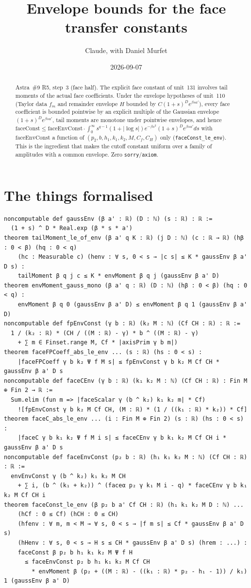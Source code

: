 \documentclass[11pt]{article}
\title{Envelope bounds for the face transfer constants}
\author{Claude, with Daniel Murfet}
\date{2026-09-07}
\begin{document}
\maketitle
\sloppy

\begin{abstract}
Astra~\#9 R5, step~3 (face half). The explicit face constant of unit~131 involves tail moments of
the actual face coefficients. Under the envelope hypotheses of unit~110 (Taylor data $f_m$ and
remainder envelope $H$ bounded by $C(1+s)^De^{\beta sa'}$), every face coefficient is bounded
pointwise by an explicit multiple of the Gaussian envelope $(1+s)^De^{\beta sa'}$, tail moments are
monotone under pointwise envelopes, and hence
$\mathrm{faceConst}\le\mathrm{faceEnvConst}\cdot\int_0^\infty s^{q-1}(1+|\log s|)e^{-\beta s^2}(1+s)^De^{\beta sa'}ds$
with $\mathrm{faceEnvConst}$ a function of $(p_2,b,h_1,k_1,k_2,M,C_f,C_H)$ only
(\texttt{faceConst\_le\_env}). This is the ingredient that makes the cutoff constant uniform over a
family of amplitudes with a common envelope. Zero \texttt{sorry}/\texttt{axiom}.
\end{abstract}

\section{The things formalised}
{\small
\begin{verbatim}
noncomputable def gaussEnv (β a' : ℝ) (D : ℕ) (s : ℝ) : ℝ :=
  (1 + s) ^ D * Real.exp (β * s * a')
theorem tailMoment_le_of_env (β a' q K : ℝ) (j D : ℕ) (c : ℝ → ℝ) (hβ : 0 < β) (hq : 0 < q)
    (hc : Measurable c) (henv : ∀ s, 0 < s → |c s| ≤ K * gaussEnv β a' D s) :
    tailMoment β q j c ≤ K * envMoment β q j (gaussEnv β a' D)
theorem envMoment_gauss_mono (β a' q : ℝ) (D : ℕ) (hβ : 0 < β) (hq : 0 < q) :
    envMoment β q 0 (gaussEnv β a' D) ≤ envMoment β q 1 (gaussEnv β a' D)
noncomputable def fpEnvConst (γ b : ℝ) (k₂ M : ℕ) (Cf CH : ℝ) : ℝ :=
  1 / (k₂ : ℝ) * (CH / ((M : ℝ) - γ) * b ^ ((M : ℝ) - γ)
    + ∑ m ∈ Finset.range M, Cf * |axisPrim γ b m|)
theorem faceFPCoeff_abs_le_env ... (s : ℝ) (hs : 0 < s) :
    |faceFPCoeff γ b k₂ Ψ f M s| ≤ fpEnvConst γ b k₂ M Cf CH * gaussEnv β a' D s
noncomputable def faceCEnv (γ b : ℝ) (k₁ k₂ M : ℕ) (Cf CH : ℝ) : Fin M ⊕ Fin 2 → ℝ :=
  Sum.elim (fun m => |faceScalar γ (b ^ k₂) k₁ k₂ m| * Cf)
    ![fpEnvConst γ b k₂ M Cf CH, (M : ℝ) * (1 / ((k₁ : ℝ) * k₂)) * Cf]
theorem faceC_abs_le_env ... (i : Fin M ⊕ Fin 2) (s : ℝ) (hs : 0 < s) :
    |faceC γ b k₁ k₂ Ψ f M i s| ≤ faceCEnv γ b k₁ k₂ M Cf CH i * gaussEnv β a' D s
noncomputable def faceEnvConst (p₂ b : ℝ) (h₁ k₁ k₂ M : ℕ) (Cf CH : ℝ) : ℝ :=
  envEnvConst γ (b ^ k₂) k₁ k₂ M CH
    + ∑ i, (b ^ (k₁ + k₂)) ^ (faceα p₂ γ k₁ M i - q) * faceCEnv γ b k₁ k₂ M Cf CH i
theorem faceConst_le_env (β p₂ b a' Cf CH : ℝ) (h₁ k₁ k₂ M D : ℕ) ...
    (hCf : 0 ≤ Cf) (hCH : 0 ≤ CH)
    (hfenv : ∀ m, m < M → ∀ s, 0 < s → |f m s| ≤ Cf * gaussEnv β a' D s)
    (hHenv : ∀ s, 0 < s → H s ≤ CH * gaussEnv β a' D s) (hrem : ...) :
    faceConst β p₂ b h₁ k₁ k₂ M Ψ f H
      ≤ faceEnvConst p₂ b h₁ k₁ k₂ M Cf CH
        * envMoment β (p₂ + ((M : ℝ) - ((k₁ : ℝ) * p₂ - h₁ - 1)) / k₁) 1 (gaussEnv β a' D)
\end{verbatim}
}
\end{document}
